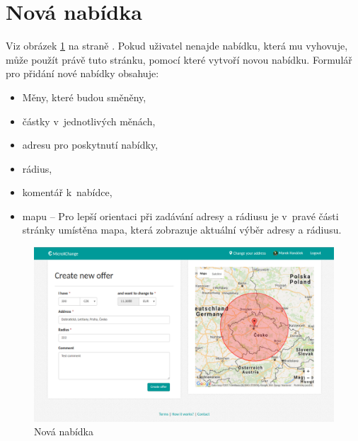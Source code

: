 \section{Nová nabídka}

\label{nur:new-offer}

Viz obrázek \ref{fig:tur:new-offer} na straně \pageref{fig:tur:new-offer}. Pokud uživatel nenajde nabídku, která mu vyhovuje, může použít právě tuto stránku, pomocí které vytvoří novou nabídku. Formulář pro přidání nové nabídky obsahuje:
\begin{itemize}
    \item Měny, které budou směněny,
    \item částky v~jednotlivých měnách,
	\item adresu pro poskytnutí nabídky,
	\item rádius,
	\item komentář k~nabídce,
	\item mapu -- Pro lepší orientaci při zadávání adresy a rádiusu je v~pravé části stránky umístěna mapa, která zobrazuje aktuální výběr adresy a rádiusu.
\end{itemize}

\begin{figure}[!h]
    \centering
    \includegraphics[width=1.0\textwidth]{media/tur/new-offer.png}
    \caption{Nová nabídka}
    \label{fig:tur:new-offer}
\end{figure}